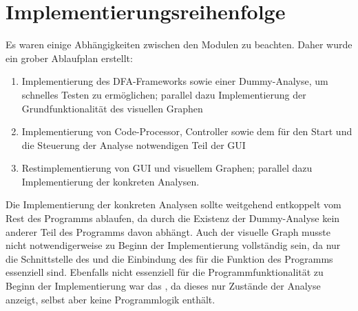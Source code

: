 \newpage
\section{Implementierungsreihenfolge}

Es waren einige Abhängigkeiten zwischen den Modulen zu beachten. Daher wurde ein grober Ablaufplan erstellt:

\begin{enumerate}
  \item Implementierung des DFA-Frameworks sowie einer Dummy-Analyse, um schnelles Testen zu ermöglichen; parallel dazu Implementierung der Grundfunktionalität des visuellen Graphen
  \item Implementierung von Code-Processor, Controller sowie dem für den Start und die Steuerung der Analyse notwendigen Teil der GUI
  \item Restimplementierung von GUI und visuellem Graphen; parallel dazu Implementierung der konkreten Analysen.
\end{enumerate}

Die Implementierung der konkreten Analysen sollte weitgehend entkoppelt vom Rest des Programms ablaufen, da durch die Existenz der Dummy-Analyse kein anderer Teil des Programms davon abhängt.
Auch der visuelle Graph musste nicht notwendigerweise zu Beginn der Implementierung vollständig sein, da nur die Schnittstelle des  und die Einbindung des  für die Funktion des Programms essenziell sind.
Ebenfalls nicht essenziell für die Programmfunktionalität zu Beginn der Implementierung war das , da dieses nur Zustände der Analyse anzeigt, selbst aber keine Programmlogik enthält.

